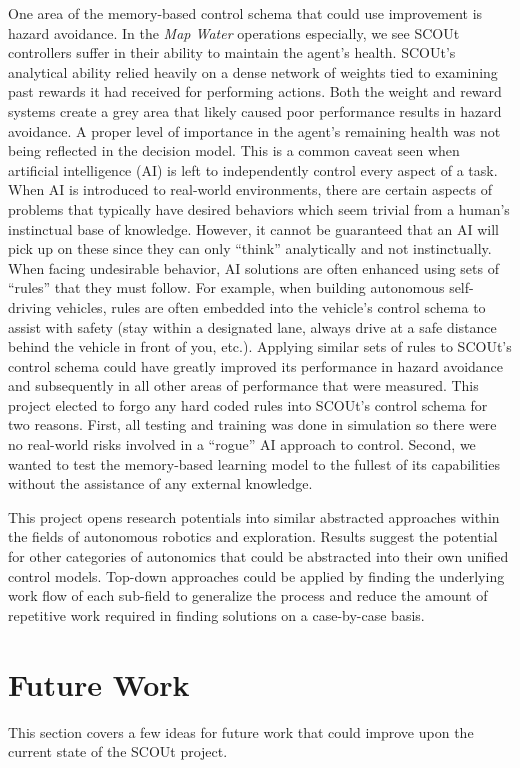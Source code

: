 One area of the memory-based control schema that could use improvement is hazard avoidance.
In the \textit{Map Water} operations especially, we see SCOUt controllers suffer in their ability to maintain the agent's health.
SCOUt's analytical ability relied heavily on a dense network of weights tied to examining past rewards it had received for performing actions.
Both the weight and reward systems create a grey area that likely caused poor performance results in hazard avoidance.
A proper level of importance in the agent's remaining health was not being reflected in the decision model.
This is a common caveat seen when artificial intelligence (AI) is left to independently control every aspect of a task.
When AI is introduced to real-world environments, there are certain aspects of problems that typically have desired behaviors which seem trivial from a human's instinctual base of knowledge.
However, it cannot be guaranteed that an AI will pick up on these since they can only ``think'' analytically and not instinctually.
When facing undesirable behavior, AI solutions are often enhanced using sets of ``rules'' that they must follow.
For example, when building autonomous self-driving vehicles, rules are often embedded into the vehicle's control schema to assist with safety (stay within a designated lane, always drive at a safe distance behind the vehicle in front of you, etc.).
Applying similar sets of rules to SCOUt's control schema could have greatly improved its performance in hazard avoidance and subsequently in all other areas of performance that were measured.
This project elected to forgo any hard coded rules into SCOUt's control schema for two reasons.
First, all testing and training was done in simulation so there were no real-world risks involved in a ``rogue'' AI approach to control.
Second, we wanted to test the memory-based learning model to the fullest of its capabilities without the assistance of any external knowledge.

This project opens research potentials into similar abstracted approaches within the fields of autonomous robotics and exploration.
Results suggest the potential for other categories of autonomics that could be abstracted into their own unified control models.
Top-down approaches could be applied by finding the underlying work flow of each sub-field to generalize the process and reduce the amount of repetitive work required in finding solutions on a case-by-case basis.




\section{Future Work} \label{sec:future_work}
This section covers a few ideas for future work that could improve upon the current state of the SCOUt project.

